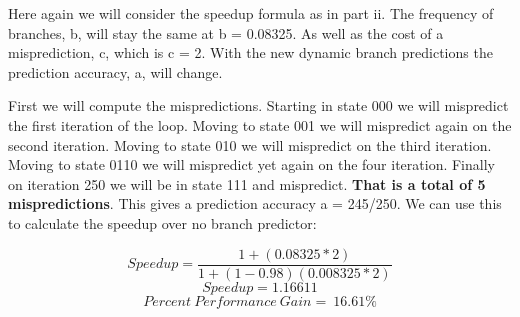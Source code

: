 \documentclass[a4paper, 11pt]{exam}
\begin{document}
\begin{enumerate}
\begin{enumerate}
\hfill

Here again we will consider the speedup formula as in part ii. The frequency of branches, b, will stay the same at b = 0.08325. As well as the cost of a misprediction, c, which is c = 2. With the new dynamic branch predictions the prediction accuracy, a, will change.

First we will compute the mispredictions. Starting in state 000 we will mispredict the first iteration of the loop. Moving to state 001 we will mispredict again on the second iteration. Moving to state 010 we will mispredict on the third iteration. Moving to state 0110 we will mispredict yet again on the four iteration. Finally on iteration 250 we will be in state 111 and mispredict. \textbf{That is a total of 5 mispredictions}. This gives a prediction accuracy a = 245/250. We can use this to calculate the speedup over no branch predictor:

$$Speedup = \frac{1 + (0.08325 * 2)}{1 + (1 - 0.98)(0.008325 * 2)}$$
$$Speedup = 1.16611$$
$$Percent \ Performance \ Gain = ~16.61\%$$


\end{enumerate}


\end{enumerate}
\end{document}
